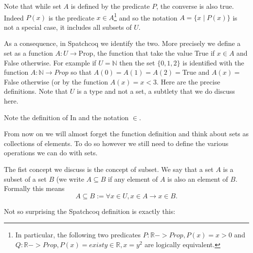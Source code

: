 Note that while set $A$ is defined by the predicate $P$, the converse is also true. Indeed  $P(x)$ is the predicate $x \in A$\footnote{In particular, the following two predicates $P:\mathbb{R}->Prop, P(x)= x>0$ and $Q:\mathbb{R}->Prop, P(x)=exist y \in \mathbb{R}, x=y^{2}$ are logically equivalent.
} and so the notation $A=\{x \mid P(x)\}$ is not a special case, it includes all subsets of $U$. 




As a consequence,  in Spatchcoq we identify the two. More precisely we define a set as a function $A:U \rightarrow \mbox{Prop}$, the function that take the value True if $x \in A$ and False otherwise.  For example if $U=\mathbb{N}$ then the set $\{0,1,2\}$ is identified with the function $A:\mathbb{N}\rightarrow Prop$ so that $A(0)=A(1)=A(2)=$True and $A(x) =$ False otherwise (or by the function $A(x)=x<3$. Here are the precise definitions. Note that $U$ is a  type and not a set,  a subtlety that we do discuss here.


Note the definition of In and the notation $\in$.


From now on we will almost forget the function definition and think about sets as collections of elements. To do so however we still need to define the various operations we can do with sets. 

The fist concept we discuss is the concept of subset. We say that a set $A$ is a subset of a set $B$ (we write $A\subseteq B$ if any element of $A$ is also an element of $B$. Formally this means
$$A \subseteq B := \forall x \in U, x \in A \rightarrow x \in B.$$

Not so surprising the Spatchcoq definition is exactly this:



